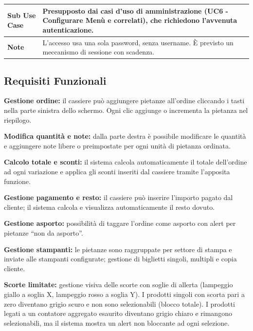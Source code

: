 \begin{center}
\begin{tabular}{|p{}|p{}|}
\textbf{Sub Use Case} & Presupposto dai casi d'uso di amministrazione (UC6 - Configurare Menù e correlati), che richiedono l'avvenuta autenticazione. \\ \hline
\textbf{Note} & L'accesso usa una sola password, senza username. È previsto un meccanismo di sessione con scadenza. \\ \hline
\end{tabular}
\end{center}

\newpage 

\subsection{Requisiti Funzionali}
\begin{description}[leftmargin=2.5cm, labelwidth=2cm]
  \item[RF-01] \textbf{Gestione ordine:} il cassiere può aggiungere pietanze
        all'ordine cliccando i tasti nella parte sinistra dello schermo. Ogni
        clic aggiunge o incrementa la pietanza nel riepilogo.

  \item[RF-02] \textbf{Modifica quantità e note:} dalla parte destra è possibile
        modificare le quantità e aggiungere note libere o preimpostate per ogni
        unità di pietanza ordinata.

  \item[RF-03a] \textbf{Calcolo totale e sconti:} il sistema calcola
        automaticamente il totale dell'ordine ad ogni variazione e applica
        gli sconti inseriti dal cassiere tramite l'apposita funzione.

  \item[RF-03b] \textbf{Gestione pagamento e resto:} il cassiere può inserire
        l'importo pagato dal cliente; il sistema calcola e visualizza
        automaticamente il resto dovuto.

  \item[RF-04] \textbf{Gestione asporto:} possibilità di taggare l'ordine come
        asporto con alert per pietanze ``non da asporto''.

  \item[RF-05] \textbf{Gestione stampanti:} le pietanze sono raggruppate per
        settore di stampa e inviate alle stampanti configurate; gestione di
        biglietti singoli, multipli e copia cliente.

  \item[RF-06] \textbf{Scorte limitate:} gestione visiva delle scorte con soglie
        di allerta (lampeggio giallo a soglia X, lampeggio rosso a soglia Y).
        I prodotti singoli con scorta pari a zero diventano grigio scuro e non
        sono selezionabili (blocco totale). I prodotti legati a un contatore
        aggregato esaurito diventano grigio chiaro e rimangono selezionabili,
        ma il sistema mostra un alert non bloccante ad ogni selezione.


\end{description}
